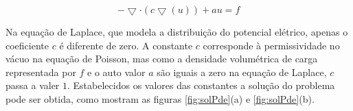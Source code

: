 \documentclass[
    12pt,               %
    openright,          %
    oneside,
    a4paper,            %
    english,            %
    french,             %
    spanish,            %
    brazil              %
    ]{abntex2}
\begin{document}
\begin{equation}
\label{eq:geral}
- \bigtriangledown\cdot(c\bigtriangledown(u)) + au = f
\end{equation} 

Na equação de Laplace, que modela a distribuição do potencial elétrico, apenas o coeficiente $c$ é diferente de zero. A constante $c$ corresponde à permissividade no vácuo na equação de Poisson, mas como a densidade volumétrica de carga representada por $f$  e o auto valor $a$ são iguais a zero na equação de Laplace, $c$ passa a valer $1$. Estabelecidos os valores das constantes a solução do problema pode ser obtida, como mostram as figuras \ref{fig:solPde}{(a)} e \ref{fig:solPde}{(b)}.

\begin{figure}%
	\centering	
	\qquad

\end{figure}
\end{document}
